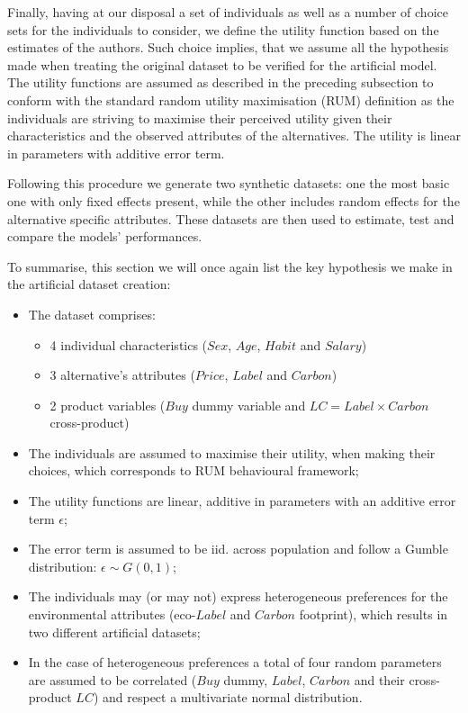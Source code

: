 \documentclass[12pt,]{article}
\providecommand{\tightlist}{%
  \setlength{\itemsep}{0pt}\setlength{\parskip}{0pt}}
\begin{document}
Finally, having at our disposal a set of individuals as well as a number
of choice sets for the individuals to consider, we define the utility
function based on the estimates of the authors. Such choice implies,
that we assume all the hypothesis made when treating the original
dataset to be verified for the artificial model. The utility functions
are assumed as described in the preceding subsection to conform with the
standard random utility maximisation (RUM) definition as the individuals
are striving to maximise their perceived utility given their
characteristics and the observed attributes of the alternatives. The
utility is linear in parameters with additive error term.

Following this procedure we generate two synthetic datasets: one the
most basic one with only fixed effects present, while the other includes
random effects for the alternative specific attributes. These datasets
are then used to estimate, test and compare the models' performances.

To summarise, this section we will once again list the key hypothesis we
make in the artificial dataset creation:

\begin{itemize}
\tightlist
\item
  The dataset comprises:

  \begin{itemize}
  \tightlist
  \item
    4 individual characteristics (\(Sex\), \(Age\), \(Habit\) and
    \(Salary\))
  \item
    3 alternative's attributes (\(Price\), \(Label\) and \(Carbon\))
  \item
    2 product variables (\(Buy\) dummy variable and
    \(LC = Label \times Carbon\) cross-product)
  \end{itemize}
\item
  The individuals are assumed to maximise their utility, when making
  their choices, which corresponds to RUM behavioural framework;
\item
  The utility functions are linear, additive in parameters with an
  additive error term \(\epsilon\);
\item
  The error term is assumed to be iid. across population and follow a
  Gumble distribution: \(\epsilon \sim G(0, 1)\);
\item
  The individuals may (or may not) express heterogeneous preferences for
  the environmental attributes (eco-\(Label\) and \(Carbon\) footprint),
  which results in two different artificial datasets;
\item
  In the case of heterogeneous preferences a total of four random
  parameters are assumed to be correlated (\(Buy\) dummy, \(Label\),
  \(Carbon\) and their cross-product \(LC\)) and respect a multivariate
  normal distribution.
\end{itemize}
\end{document}
